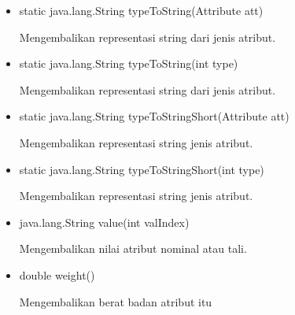 \begin{itemize}
	\item static java.lang.String typeToString(Attribute att)
	
	Mengembalikan representasi string dari jenis atribut.
	
	\item static java.lang.String typeToString(int type)
	
	Mengembalikan representasi string dari jenis atribut.
	
	\item static java.lang.String typeToStringShort(Attribute att)
	
	Mengembalikan representasi string jenis atribut.
	
	\item static java.lang.String typeToStringShort(int type)
	
	Mengembalikan representasi string jenis atribut.
	
	\item java.lang.String value(int valIndex)
	
	Mengembalikan nilai atribut nominal atau tali.
	
	\item double weight()
	
	Mengembalikan berat badan atribut itu
	
\end{itemize}
